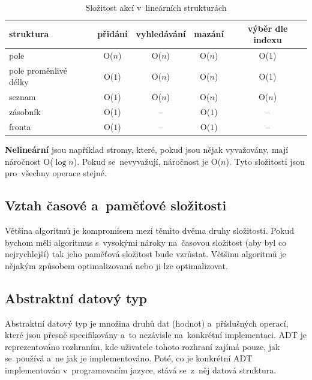 \begin{table}[h]
	\centering
	\caption{Složitost akcí v~lineárních strukturách}
	\begin{tabular}{|l||c|c|c|c|}\hline
		struktura             & přidání    & vyhledávání & mazání     & výběr dle indexu \\\hline\hline
		pole                  & O(\( n \)) & O(\( n \))  & O(\( n \)) & O(\( 1 \))       \\\hline
		pole proměnlivé délky & O(\( 1 \)) & O(\( n \))  & O(\( n \)) & O(\( 1 \))       \\\hline
		seznam                & O(\( 1 \)) & O(\( n \))  & O(\( n \)) & O(\( n \))       \\\hline
		zásobník              & O(\( 1 \)) & --          & O(\( 1 \)) & --               \\\hline
		fronta                & O(\( 1 \)) & --          & O(\( 1 \)) & --               \\\hline
	\end{tabular}
\end{table}

\textbf{Nelineární} jsou například stromy, které, pokud jsou nějak vyvažovány, mají náročnost O(\( \log{n} \)). Pokud se~nevyvažují, náročnost je O(\( n \)). Tyto složitosti jsou pro~všechny operace stejné.

\subsection{Vztah časové a~paměťové složitosti}

Většina algoritmů je kompromisem mezi těmito dvěma druhy složitosti. Pokud bychom měli algoritmus s~vysokými nároky na~časovou složitost (aby byl co nejrychlejší) tak jeho paměťová složitost bude vzrůstat. Většinu algoritmů je nějakým způsobem optimalizovaná nebo ji lze optimalizovat.

\subsection{Abstraktní datový typ}

Abstraktní datový typ je množina druhů dat (hodnot) a~příslušných operací, které jsou přesně specifikovány a~to nezávisle na~konkrétní implementaci. ADT je reprezentováno rozhraním, kde uživatele tohoto rozhraní zajímá pouze, jak se~používá a~ne jak je implementováno. Poté, co je konkrétní ADT implementován v~programovacím jazyce, stává se~z~něj datová struktura.

